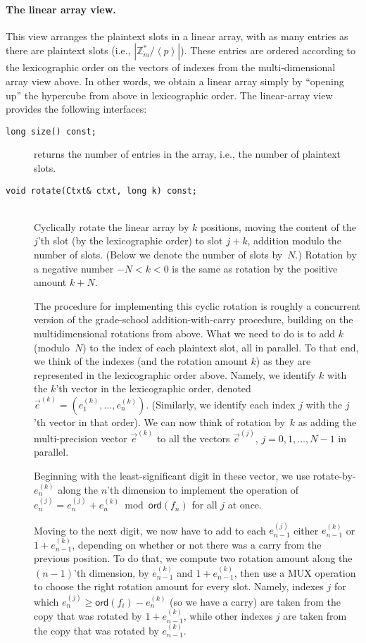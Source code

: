 \documentclass[14pt]{extarticle}
\newcommand{\Z}{\mathbb{Z}}
\newcommand{\grp}[1]{\left\langle #1 \right\rangle}
\def\ord{\mathsf{ord}}
\begin{document}
\paragraph{The linear array view.}
This view arranges the plaintext slots in a linear array, with as many
entries as there are plaintext slots (i.e., $|\Z_m^*/\grp{p}|$). These
entries are ordered according to the lexicographic order on the vectors
of indexes from the multi-dimensional array view above.
In other words, we obtain a linear array simply by ``opening up'' the
hypercube from above in lexicographic order. The linear-array view
provides the following interfaces:

\begin{description}
\item[\texttt{long size() const;}] returns the number of entries in
the array, i.e., the number of plaintext slots.

\item[\texttt{void rotate(Ctxt\& ctxt, long k) const;}]\ \\
Cyclically rotate the linear array by $k$ positions, moving the
content of the $j$'th slot (by the lexicographic order) to slot $j+k$,
addition modulo the number of slots. (Below we denote the
number of slots by~$N$.) Rotation by a negative number $-N<k<0$ is
the same as rotation by the positive amount $k+N$.

The procedure for implementing this cyclic rotation is roughly a
concurrent version of the grade-school addition-with-carry procedure,
building on the multidimensional rotations from above. What we need
to do is to add $k$ (modulo~$N$) to the index of each plaintext slot,
all in parallel. To that end, we think of the indexes (and the
rotation amount $k$) as they are represented in the lexicographic
order above. Namely, we identify $k$ with the $k$'th vector in the
lexicographic order, denoted $\vec{e}^{(k)}= (e^{(k)}_1,\ldots,
e^{(k)}_n)$. (Similarly, we identify each index $j$ with the $j$'th
vector in that order). We can now think of rotation by~$k$ as adding
the multi-precision vector $\vec{e}^{(k)}$ to all the vectors
$\vec{e}^{(j)}$, $j=0,1,\ldots,N-1$ in parallel.

Beginning with the least-significant digit in these vector, we use
rotate-by-$e^{(k)}_n$ along the $n$'th dimension to implement the
operation of $e^{(j)}_n = e^{(j)}_n+e^{(k)}_n\bmod\ord(f_n)$ for all $j$
at once. 

Moving to the next digit, we now have to add to each $e^{(j)}_{n-1}$
either $e^{(k)}_{n-1}$ or $1+e^{(k)}_{n-1}$, depending on whether or
not there was a carry from the previous position. To do that, we
compute two rotation amount along the $(n-1)$'th dimension, by
$e^{(k)}_{n-1}$ and $1+e^{(k)}_{n-1}$, then use a MUX operation to
choose the right rotation amount for every slot. Namely, indexes $j$
for which $e^{(j)}_n\ge\ord(f_i)-e^{(k)}_n$ (so we have a carry) are
taken from the copy that was rotated by $1+e^{(k)}_{n-1}$, while
other indexes $j$ are taken from the copy that was rotated by
$e^{(k)}_{n-1}$.


\end{description}
\end{document}
